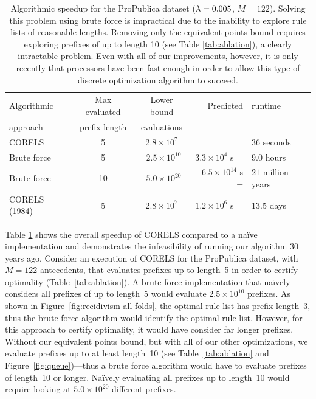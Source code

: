 \begin{table}[t!]
\centering
\begin{tabular}{l|c|c|r l}
Algorithmic & Max evaluated & Lower bound & Predicted&runtime \\
approach & prefix length & evaluations & \\
\hline
CORELS & 5  & $ 2.8 \times 10^7$ & &$36$ seconds \\
Brute force & 5 & ~$2.5 \times 10^{10}$ & $3.3 \times 10^4$ s =&$9.0$ hours \\
Brute force & 10 & ~$5.0 \times 10^{20}$ & $6.5 \times 10^{14}$ s =&$21$ million years \\
CORELS (1984) & 5 & $2.8 \times 10^7$ & $1.2 \times 10^6$ s =&$13.5$ days \\
\end{tabular}
\caption{Algorithmic speedup for the ProPublica dataset (${{\lambda} = 0.005}$, ${M = 122}$).
%
Solving this problem using brute force is impractical due to the inability to explore rule lists of reasonable lengths.
%
Removing only the equivalent points bound requires exploring prefixes of up to length 10 (see Table \ref{tab:ablation}), a clearly intractable problem.
%
Even with all of our improvements, however, it is only recently that processors have been fast enough in order to allow this type of discrete optimization algorithm to succeed.
}
\label{tab:speedup}
\end{table}

Table \ref{tab:speedup} shows the overall speedup of CORELS compared to a na\"ive implementation
and demonstrates the infeasibility of running our algorithm 30 years ago.
%
Consider an execution of CORELS for the ProPublica dataset, with ${M = 122}$ antecedents,
that evaluates prefixes up to length~5 in order to certify optimality (Table~\ref{tab:ablation}).
%
A brute force implementation that na\"ively considers all prefixes of up to length~5
would evaluate ${2.5 \times 10^{10}}$ prefixes.
%
As shown in Figure~\ref{fig:recidivism-all-folds}, the optimal rule list has prefix length~3,
thus the brute force algorithm would identify the optimal rule list.
%
However, for this approach to certify optimality, it would have consider far longer prefixes.
%
Without our equivalent points bound, but with all of our other optimizations,
we evaluate prefixes up to at least length~10
(see Table~\ref{tab:ablation} and Figure~\ref{fig:queue})---thus a brute force algorithm
would have to evaluate prefixes of length~10 or longer.
%
Na\"ively evaluating all prefixes up to length~10 would require looking at ${5.0 \times 10^{20}}$ different prefixes.

